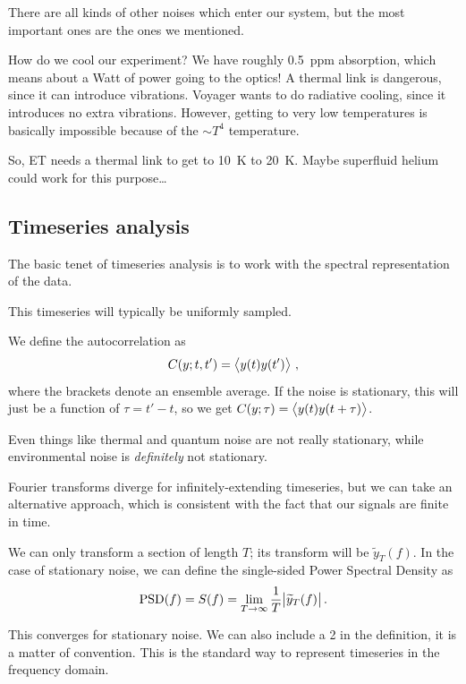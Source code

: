 \documentclass[main.tex]{subfiles}
\begin{document}
There are all kinds of other noises which enter our system, but the most important ones are the ones we mentioned. 

How do we cool our experiment? 
We have roughly \SI{.5}{ppm} absorption, which means about a Watt of power going to the optics! 
A thermal link is dangerous, since it can introduce 
vibrations. 
Voyager wants to do radiative cooling, since it introduces no extra vibrations. 
However, getting to very low temperatures is basically impossible because of the \(\sim T^{4}\) temperature. 

So, ET needs a thermal link to get to \SI{10}{K} to \SI{20}{K}. 
Maybe superfluid helium could work for this purpose\dots

\subsection{Timeseries analysis}

The basic tenet of timeseries analysis is to work with the spectral representation of the data. 

This timeseries will typically be uniformly sampled. 

We define the autocorrelation as 
%
\begin{align}
C(y; t, t') = \expval{y(t) y(t')}
\,,
\end{align}
%
where the brackets denote an ensemble average.
If the noise is stationary, this will just be a function of \(\tau = t' - t\), so we get \(C(y; \tau ) = \expval{y(t) y(t + \tau )}\).

Even things like thermal and quantum noise are not really stationary, while environmental noise is \emph{definitely} not stationary. 

Fourier transforms diverge for infinitely-extending timeseries, but we can take an alternative approach, which is consistent with the fact that our signals are finite in time. 

We can only transform a section of length \(T\); its transform will be \(\widetilde{y}_T(f)\).
In the case of stationary noise, we can define the single-sided Power Spectral Density as 
%
\begin{align}
\text{PSD}(f) = S(f) = \lim_{T \to \infty} \frac{1}{T} \abs{\widetilde{y}_T(f)}
\,.
\end{align}

This converges for stationary noise. 
We can also include a 2 in the definition, it is a matter of convention.  
This is the standard way to represent timeseries in the frequency domain. 
\end{document}
